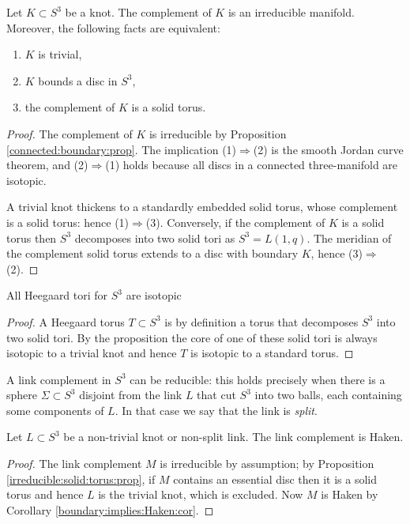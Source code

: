\begin{prop}
Let $K\subset S^3$ be a knot. The complement of $K$ is an irreducible manifold. Moreover, the following facts are equivalent:
\begin{enumerate}
\item $K$ is trivial,
\item $K$ bounds a disc in $S^3$,
\item the complement of $K$ is a solid torus.
\end{enumerate}
\end{prop}
\begin{proof}
The complement of $K$ is irreducible by Proposition \ref{connected:boundary:prop}.
The implication (1)$\Rightarrow$(2) is the smooth Jordan curve theorem, and (2)$\Rightarrow$(1) holds because all discs in a connected three-manifold are isotopic. 

A trivial knot thickens to a standardly embedded solid torus, whose complement is a solid torus: hence (1)$\Rightarrow$(3). Conversely, if the complement of $K$ is a solid torus then $S^3$ decomposes into two solid tori as $S^3=L(1,q)$. The meridian of the complement solid torus extends to a disc with boundary $K$, hence (3)$\Rightarrow$(2).
\end{proof}

\begin{cor} \label{H:tori:cor}
All Heegaard tori for $S^3$ are isotopic
\end{cor}
\begin{proof}
A Heegaard torus $T\subset S^3$ is by definition a torus that decomposes $S^3$ into two solid tori. By the proposition the core of one of these solid tori is always isotopic to a trivial knot and hence $T$ is isotopic to a standard torus.
\end{proof}

A link complement in $S^3$ can be reducible: this holds precisely when there is a sphere $\Sigma \subset S^3$ disjoint from the link $L$ that cut $S^3$ into two balls, each containing some components of $L$. In that case we say that the link is  \emph{split}.

\begin{cor}
Let $L\subset S^3$ be a non-trivial knot or non-split link. The link complement is Haken.
\end{cor}
\begin{proof}
The link complement $M$ is irreducible by assumption; by Proposition \ref{irreducible:solid:torus:prop}, if $M$ contains an essential disc then it is a solid torus and hence $L$ is the trivial knot, which is excluded. Now $M$ is Haken by Corollary \ref{boundary:implies:Haken:cor}.
\end{proof}

